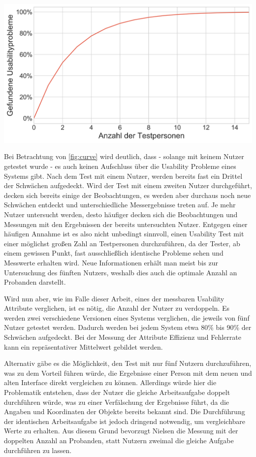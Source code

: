 \begin{center}
  \includegraphics[width=0.7\linewidth]{figures/curve.png}
  \label{fig:curve}
\end{center}

Bei Betrachtung von \cref{fig:curve} wird deutlich, dass - solange mit keinem Nutzer getestet wurde - es auch keinen Aufschluss über die Usability Probleme eines Systems gibt.
Nach dem Test mit einem Nutzer, werden bereits fast ein Drittel der Schwächen aufgedeckt.
Wird der Test mit einem zweiten Nutzer durchgeführt, decken sich bereits einige der Beobachtungen, es werden aber durchaus noch neue Schwächen entdeckt und unterschiedliche Messergebnisse treten auf.
Je mehr Nutzer untersucht werden, desto häufiger decken sich die Beobachtungen und Messungen mit den Ergebnissen der bereits untersuchten Nutzer.\cite{.h}
Entgegen einer häufigen Annahme ist es also nicht unbedingt sinnvoll, einen Usability Test mit einer möglichst großen Zahl an Testpersonen durchzuführen, da der Tester, ab einem gewissen Punkt, fast ausschließlich identische Probleme sehen und Messwerte erhalten wird.
Neue Informationen erhält man meist bis zur Untersuchung des fünften Nutzers, weshalb dies auch die optimale Anzahl an Probanden darstellt.

Wird nun aber, wie im Falle dieser Arbeit, eines der messbaren Usability Attribute verglichen, ist es nötig, die Anzahl der Nutzer zu verdoppeln.
Es werden zwei verschiedene Versionen eines Systems verglichen, die jeweils von fünf Nutzer getestet werden.
Dadurch werden bei jedem System etwa 80\% bis 90\% der Schwächen aufgedeckt.
Bei der Messung der Attribute Effizienz und Fehlerrate kann ein repräsentativer Mittelwert gebildet werden.

Alternativ gäbe es die Möglichkeit, den Test mit nur fünf Nutzern durchzuführen, was zu dem Vorteil führen würde, die Ergebnisse einer Person mit dem neuen und alten Interface direkt vergleichen zu können.
Allerdings würde hier die Problematik entstehen, dass der Nutzer die gleiche Arbeitsaufgabe doppelt durchführen würde, was zu einer Verfälschung der Ergebnisse führt, da die Angaben und Koordinaten der Objekte bereits bekannt sind.
Die Durchführung der identischen Arbeitsaufgabe ist jedoch dringend notwendig, um vergleichbare Werte zu erhalten.
Aus diesem Grund bevorzugt Nielsen die Messung mit der doppelten Anzahl an Probanden, statt Nutzern zweimal die gleiche Aufgabe durchführen zu lassen.\cite{.h}

